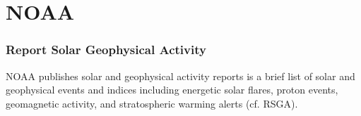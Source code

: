 \documentclass[dec_sum_main.tex]{subfiles}
\begin{document}
\pagebreak

\section{NOAA}

\subsubsection{Report Solar Geophysical Activity}
NOAA publishes solar and geophysical activity reports is a brief list of solar and geophysical events and indices including energetic solar flares, proton events, geomagnetic activity, and stratospheric warming alerts (cf. RSGA). \newline

	
	 \newline
	
\end{document}
